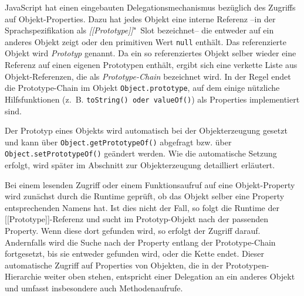 %
%


JavaScript hat einen eingebauten Delegationsmechanismus bezüglich des Zugriffs auf Objekt-Properties. Dazu hat jedes Objekt eine interne Referenz --in der Sprachspezifikation \citep[§9.1]{international2018ecmascript} als \emph{[[Prototype]]}"~Slot bezeichnet-- die entweder auf ein anderes Objekt zeigt oder den primitiven Wert \texttt{null} enthält. Das referenzierte Objekt wird \emph{Prototyp} genannt. Da ein so referenziertes Objekt selber wieder eine Referenz auf einen eigenen Prototypen enthält, ergibt sich eine verkette Liste aus Objekt-Referenzen, die als \emph{Prototype-Chain} bezeichnet wird. 
In der Regel endet die Prototype-Chain im Objekt \texttt{Object.prototype}, auf dem einige nützliche Hilfsfunktionen (z.~B. \texttt{toString() oder \texttt{valueOf()}}) als Properties implementiert sind.

Der Prototyp eines Objekts wird automatisch bei der Objekterzeugung gesetzt und kann über \texttt{Object.getPrototypeOf()} abgefragt bzw. über \texttt{Object.setPrototypeOf()} geändert werden. 
Wie die automatische Setzung erfolgt, wird später im Abschnitt zur Objekterzeugung detailliert erläutert.

Bei einem lesenden Zugriff oder einem Funktionsaufruf auf eine Objekt-Property wird zunächst durch die Runtime geprüft, ob das Objekt selber eine Property entsprechenden Namens hat. Ist dies nicht der Fall, so folgt die Runtime der [[Prototype]]-Referenz und sucht im Prototyp-Objekt nach der passenden Property. Wenn diese dort gefunden wird, so erfolgt der Zugriff darauf. Andernfalls wird die Suche nach der Property entlang der Prototype-Chain fortgesetzt, bis sie entweder gefunden wird, oder die Kette endet. Dieser automatische Zugriff auf Properties von Objekten, die in der Prototypen-Hierarchie weiter oben stehen, entspricht einer Delegation an ein anderes Objekt und umfasst insbesondere auch Methodenaufrufe.

